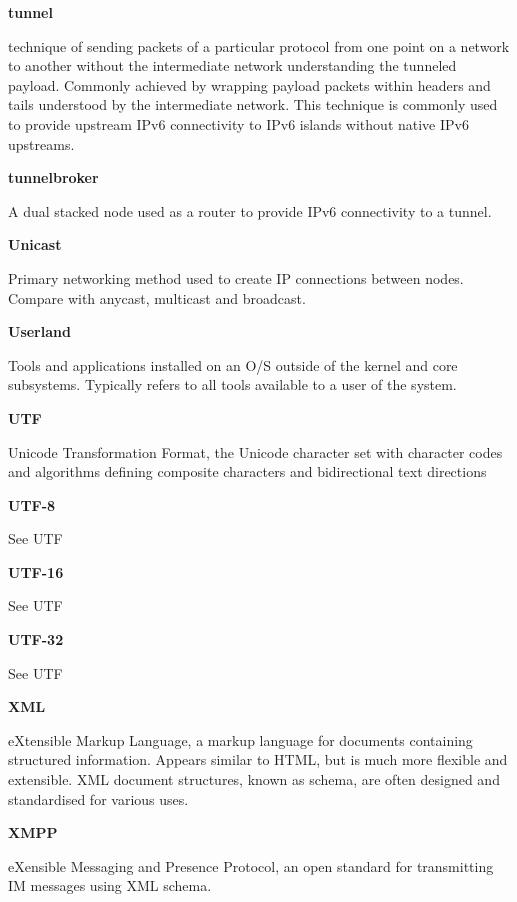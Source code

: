 \textbf{tunnel}

technique of sending packets of a particular protocol from one point on
a network to another without the intermediate network understanding the
tunneled payload. Commonly achieved by wrapping payload packets within
headers and tails understood by the intermediate network. This
technique is commonly used to provide upstream IPv6 connectivity to IPv6
islands without native IPv6 upstreams.

\textbf{tunnelbroker}

A dual stacked node used as a router to provide IPv6 connectivity to a
tunnel.

\textbf{Unicast}

Primary networking method used to create IP connections between nodes.
Compare with anycast, multicast and broadcast.

\textbf{Userland}

Tools and applications installed on an O/S outside of the kernel and
core subsystems. Typically refers to all tools available to a user of
the system.

\textbf{UTF}

Unicode Transformation Format, the Unicode character set with character 
codes and algorithms defining composite characters and bidirectional
text directions

\textbf{UTF-8}

See UTF

\textbf{UTF-16}

See UTF

\textbf{UTF-32}

See UTF

\textbf{XML}

eXtensible Markup Language, a markup language for documents containing
structured information. Appears similar to HTML, but is much more
flexible and extensible. XML document structures, known as schema, are
often designed and standardised for various uses.

\textbf{XMPP}

eXensible Messaging and Presence Protocol, an open standard for
transmitting IM messages using XML schema.
